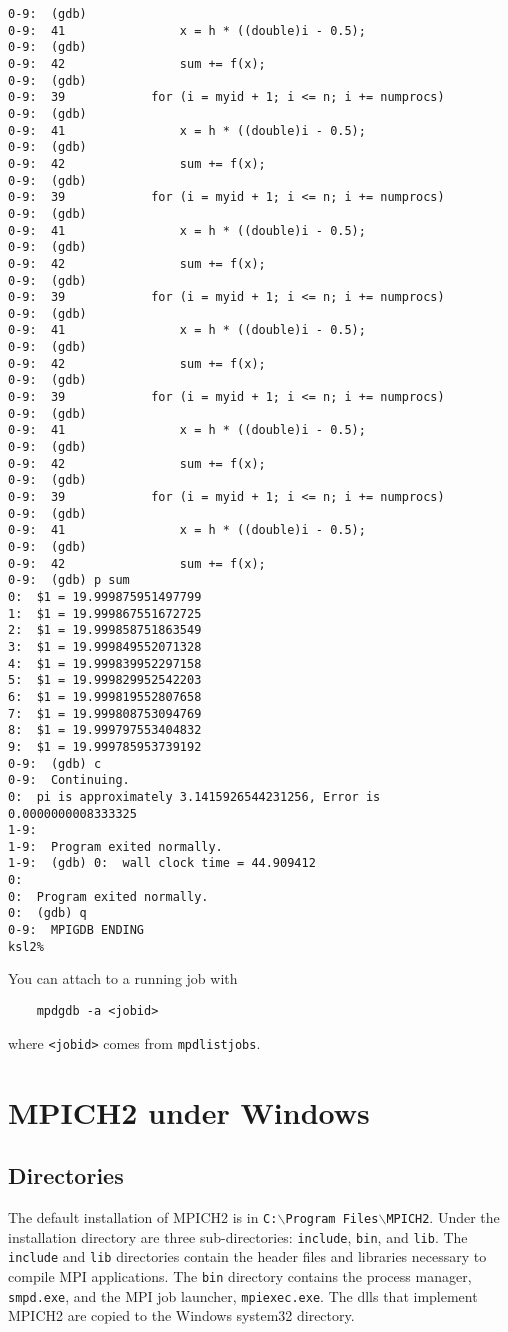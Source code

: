 \documentclass[dvipdfm,11pt]{article}
\begin{document}
\begin{small}
\begin{verbatim}
0-9:  (gdb) 
0-9:  41                x = h * ((double)i - 0.5);
0-9:  (gdb) 
0-9:  42                sum += f(x);
0-9:  (gdb) 
0-9:  39            for (i = myid + 1; i <= n; i += numprocs)
0-9:  (gdb) 
0-9:  41                x = h * ((double)i - 0.5);
0-9:  (gdb) 
0-9:  42                sum += f(x);
0-9:  (gdb) 
0-9:  39            for (i = myid + 1; i <= n; i += numprocs)
0-9:  (gdb) 
0-9:  41                x = h * ((double)i - 0.5);
0-9:  (gdb) 
0-9:  42                sum += f(x);
0-9:  (gdb) 
0-9:  39            for (i = myid + 1; i <= n; i += numprocs)
0-9:  (gdb) 
0-9:  41                x = h * ((double)i - 0.5);
0-9:  (gdb) 
0-9:  42                sum += f(x);
0-9:  (gdb) 
0-9:  39            for (i = myid + 1; i <= n; i += numprocs)
0-9:  (gdb) 
0-9:  41                x = h * ((double)i - 0.5);
0-9:  (gdb) 
0-9:  42                sum += f(x);
0-9:  (gdb) 
0-9:  39            for (i = myid + 1; i <= n; i += numprocs)
0-9:  (gdb) 
0-9:  41                x = h * ((double)i - 0.5);
0-9:  (gdb) 
0-9:  42                sum += f(x);
0-9:  (gdb) p sum
0:  $1 = 19.999875951497799
1:  $1 = 19.999867551672725
2:  $1 = 19.999858751863549
3:  $1 = 19.999849552071328
4:  $1 = 19.999839952297158
5:  $1 = 19.999829952542203
6:  $1 = 19.999819552807658
7:  $1 = 19.999808753094769
8:  $1 = 19.999797553404832
9:  $1 = 19.999785953739192
0-9:  (gdb) c
0-9:  Continuing.
0:  pi is approximately 3.1415926544231256, Error is 0.0000000008333325
1-9:  
1-9:  Program exited normally.
1-9:  (gdb) 0:  wall clock time = 44.909412
0:  
0:  Program exited normally.
0:  (gdb) q
0-9:  MPIGDB ENDING
ksl2% 
\end{verbatim}
\end{small}
You can attach to a running job with
\begin{verbatim}
    mpdgdb -a <jobid>
\end{verbatim}
where \texttt{<jobid>} comes from \texttt{mpdlistjobs}.

\section{MPICH2 under Windows}
\label{sec:windows}

\subsection{Directories}
\label{sec:windir}

The default installation of MPICH2 is in
\texttt{C:$\backslash$Program Files$\backslash$MPICH2}. Under the installation
directory are three sub-directories: \texttt{include}, \texttt{bin}, and
\texttt{lib}.  The \texttt{include} and \texttt{lib} directories contain
the header files and libraries necessary to compile MPI applications.  
The \texttt{bin} directory contains the process manager, \texttt{smpd.exe},
and the MPI job launcher, \texttt{mpiexec.exe}.  The dlls that implement
MPICH2 are copied to the Windows system32 directory.
\end{document}
